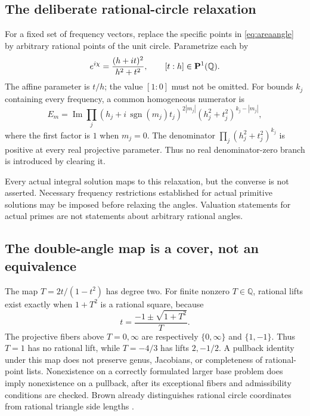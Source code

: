 \documentclass[11pt,letterpaper]{article}
\theoremstyle{definition}\newtheorem{definition}[theorem]{Definition}
\theoremstyle{remark}\newtheorem{remark}[theorem]{Remark}
\newcommand{\Q}{\mathbb Q}\newcommand{\Z}{\mathbb Z}\newcommand{\R}{\mathbb R}
\newcommand{\im}{\operatorname{Im}}\newcommand{\Impart}{\operatorname{Im}}
\begin{document}
\subsection{The deliberate rational-circle relaxation}
For a fixed set of frequency vectors, replace the specific points in \eqref{eq:areaangle} by arbitrary rational points of the unit circle. Parametrize each by
\[
e^{i\chi}=\frac{(h+it)^2}{h^2+t^2},\qquad [t:h]\in\Pone(\Q).
\]
The affine parameter is $t/h$; the value $[1:0]$ must not be omitted. For bounds $k_j$ containing every frequency, a common homogeneous numerator is
\begin{equation}\label{eq:homogeneous}
E_m=\im\prod_j
(h_j+i\,\operatorname{sgn}(m_j)t_j)^{2|m_j|}
(h_j^2+t_j^2)^{k_j-|m_j|},
\end{equation}
where the first factor is $1$ when $m_j=0$. The denominator
$\prod_j(h_j^2+t_j^2)^{k_j}$ is positive at every real projective parameter. Thus no real denominator-zero branch is introduced by clearing it.

Every actual integral solution maps to this relaxation, but the converse is not asserted. Necessary frequency restrictions established for actual primitive solutions may be imposed before relaxing the angles. Valuation statements for actual primes are not statements about arbitrary rational angles.

\subsection{The double-angle map is a cover, not an equivalence}
The map $T=2t/(1-t^2)$ has degree two. For finite nonzero $T\in\Q$, rational lifts exist exactly when $1+T^2$ is a rational square, because
\[
t=\frac{-1\pm\sqrt{1+T^2}}{T}.
\]
The projective fibers above $T=0,\infty$ are respectively $\{0,\infty\}$ and $\{1,-1\}$. Thus $T=1$ has no rational lift, while $T=-4/3$ has lifts $2,-1/2$. A pullback identity under this map does not preserve genus, Jacobians, or completeness of rational-point lists. Nonexistence on a correctly formulated larger base problem does imply nonexistence on a pullback, after its exceptional fibers and admissibility conditions are checked. Brown already distinguishes rational circle coordinates from rational triangle side lengths \cite{Brown511}.
\end{document}
